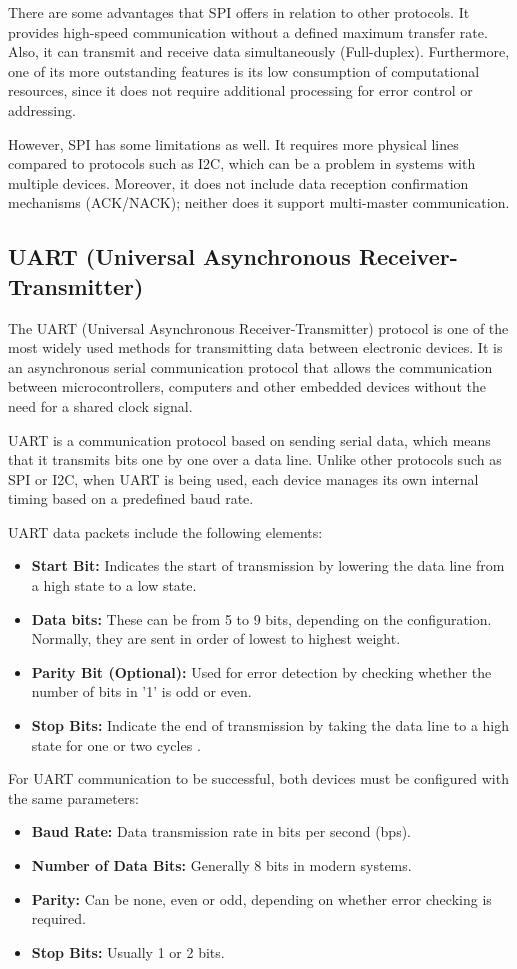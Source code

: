 There are some advantages that SPI offers in relation to other protocols. It provides high-speed communication without a defined maximum transfer rate. Also, it can transmit and receive data simultaneously (Full-duplex). Furthermore, one of its more outstanding features is its low consumption of computational resources, since it does not require additional processing for error control or addressing.

However, SPI has some limitations as well. It requires more physical lines compared to protocols such as I2C, which can be a problem in systems with multiple devices. Moreover, it does not include data reception confirmation mechanisms (ACK/NACK); neither does it support multi-master communication.

\subsection{UART (Universal Asynchronous Receiver-Transmitter)}

The UART (Universal Asynchronous Receiver-Transmitter) protocol is one of the most widely used methods for transmitting data between electronic devices. It is an asynchronous serial communication protocol that allows the communication between microcontrollers, computers and other embedded devices without the need for a shared clock signal.

UART is a communication protocol based on sending serial data, which means that it transmits bits one by one over a data line. Unlike other protocols such as SPI or I2C, when UART is being used, each device manages its own internal timing based on a predefined baud rate.

UART data packets include the following elements:

\begin{itemize}
	\item \textbf{Start Bit:} Indicates the start of transmission by lowering the data line from a high state to a low state.
	\item \textbf{Data bits:} These can be from 5 to 9 bits, depending on the configuration. Normally, they are sent in order of lowest to highest weight.
	\item \textbf{Parity Bit (Optional):} Used for error detection by checking whether the number of bits in '1' is odd or even.
	\item \textbf{Stop Bits:} Indicate the end of transmission by taking the data line to a high state for one or two cycles \cite{ref18}.
\end{itemize}

For UART communication to be successful, both devices must be configured with the same parameters:

\begin{itemize}
	\item \textbf{Baud Rate:} Data transmission rate in bits per second (bps).
	\item \textbf{Number of Data Bits:} Generally 8 bits in modern systems.
	\item \textbf{Parity:} Can be none, even or odd, depending on whether error checking is required.
	\item \textbf{Stop Bits:} Usually 1 or 2 bits.
\end{itemize}
